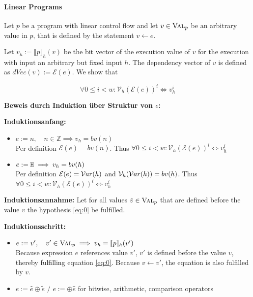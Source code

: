 \paragraph{Linear Programs}
Let $p$ be a program with linear control flow and let $v \in \textsc{Val}_p$ be an arbitrary value in $p$, that is defined by the statement $v \leftarrow e$.

Let $v_h := \llbracket p \rrbracket_h(v)$ be the bit vector of the execution value of $v$ for the execution with input an arbitrary but fixed input $h$. The dependency vector of $v$ is defined as $dVec(v) := \mathcal{E}(e)$. We show that 

\begin{equation}\label{eq:0}
    \forall 0 \leq i < w: \mathcal{V}_h(\mathcal{E}(e))^i \iff v_h^i
\end{equation}


\textbf{Beweis durch Induktion über Struktur von $e$:}

\textbf{Induktionsanfang:}
\begin{itemize}
    \item $e := n, \quad n \in \mathbb{Z} \implies v_h = bv(n)$\\
    Per definition $\mathcal{E}(e) = bv(n)$. Thus $\forall 0 \leq i < w: \mathcal{V}_h(\mathcal{E}(e))^i \iff v_h^i$
    
    \item $e := \mathtt{H} \implies v_h = bv(h)$\\
    Per definition $\mathcal{E}(e) = \mathcal{V}ar(h)$ and $\mathcal{V}_h(\mathcal{V}ar(h)) = bv(h)$. Thus\\ $\forall 0 \leq i < w: \mathcal{V}_h(\mathcal{E}(e))^i \iff v_h^i$
\end{itemize}

\textbf{Induktionsannahme:}
Let for all values $\hat{v} \in \textsc{Val}_p$ that are defined before the value $v$ the hypothesis \ref{eq:0} be fulfilled.

\textbf{Induktionsschritt:}
\begin{itemize}
    \item $e := v', \quad v' \in \textsc{Val}_p \implies v_h = \llbracket p \rrbracket_h (v')$\\
    Because expression $e$ references value $v'$, $v'$ is defined before the value $v$, thereby fulfilling equation \ref{eq:0}. Because $v \leftarrow v'$, the equation is also fulfilled by $v$.
    \item $e := \hat{e} \oplus \tilde{e}$ / $ e := \oplus \hat{e}$ for bitwise, arithmetic, comparison operators
\end{itemize}

